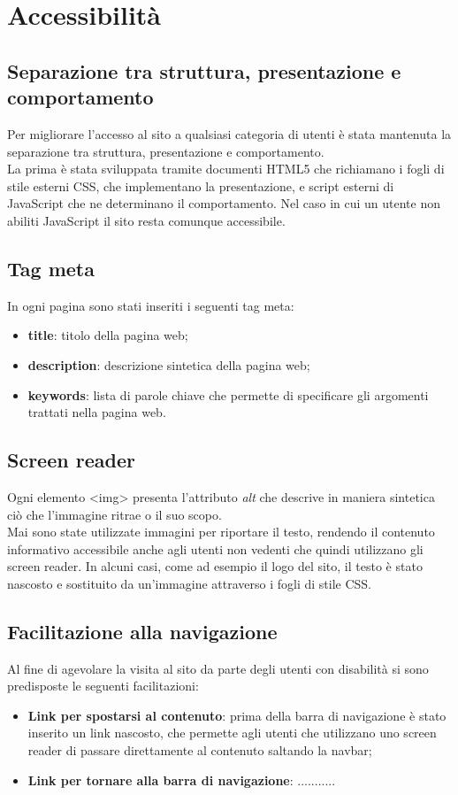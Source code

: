 \section{Accessibilità}
\subsection{Separazione tra struttura, presentazione e comportamento}
Per migliorare l'accesso al sito a qualsiasi categoria di utenti è stata mantenuta la separazione tra struttura, presentazione e comportamento. \\
La prima è stata sviluppata tramite documenti HTML5 che richiamano i fogli di stile esterni CSS, che implementano la presentazione, e script esterni di JavaScript che ne determinano il comportamento. Nel caso in cui un utente non abiliti JavaScript il sito resta comunque accessibile.
\subsection{Tag meta}
In ogni pagina sono stati inseriti i seguenti tag meta:
\begin{itemize}
	\item \textbf{title}: titolo della pagina web;
	\item \textbf{description}: descrizione sintetica della pagina web;
	\item \textbf{keywords}: lista di parole chiave che permette di specificare gli argomenti trattati nella pagina web. 
\end{itemize}
\subsection{Screen reader}
Ogni elemento <img> presenta l'attributo \textit{alt} che descrive in maniera sintetica ciò che l'immagine ritrae o il suo scopo. \\ Mai sono state utilizzate immagini per riportare il testo, rendendo il contenuto informativo accessibile anche agli utenti non vedenti che quindi utilizzano gli screen reader. In alcuni casi, come ad esempio il logo del sito, il testo è stato nascosto e sostituito da un'immagine attraverso i fogli di stile CSS.

\subsection{Facilitazione alla navigazione}
Al fine di agevolare la visita al sito da parte degli utenti con disabilità si sono predisposte le seguenti facilitazioni:
\begin{itemize}
	\item \textbf{Link per spostarsi al contenuto}: prima della barra di navigazione è stato inserito un link nascosto, che permette agli utenti che utilizzano uno screen reader di passare direttamente al contenuto saltando la navbar;
	\item \textbf{Link per tornare alla barra di navigazione}: ...........
\end{itemize}
\newpage